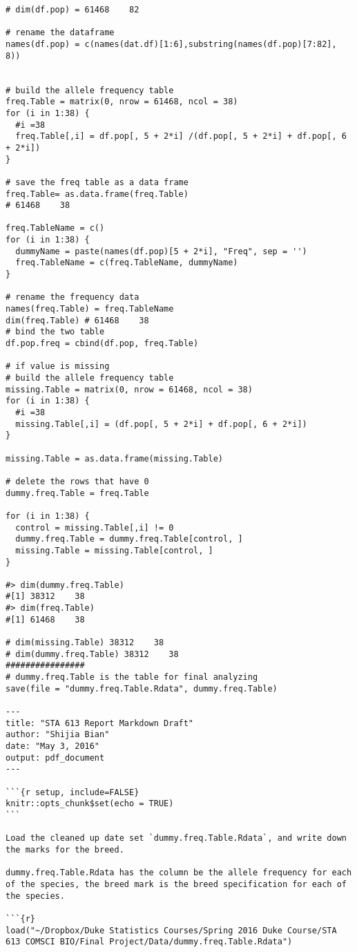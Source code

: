 \documentclass{article} %
\begin{document}
{\begin{verbatim}
# dim(df.pop) = 61468    82

# rename the dataframe
names(df.pop) = c(names(dat.df)[1:6],substring(names(df.pop)[7:82], 8))


# build the allele frequency table
freq.Table = matrix(0, nrow = 61468, ncol = 38)
for (i in 1:38) {
  #i =38
  freq.Table[,i] = df.pop[, 5 + 2*i] /(df.pop[, 5 + 2*i] + df.pop[, 6 + 2*i])
}

# save the freq table as a data frame
freq.Table= as.data.frame(freq.Table)
# 61468    38

freq.TableName = c()
for (i in 1:38) {
  dummyName = paste(names(df.pop)[5 + 2*i], "Freq", sep = '')
  freq.TableName = c(freq.TableName, dummyName)
}
  
# rename the frequency data
names(freq.Table) = freq.TableName
dim(freq.Table) # 61468    38
# bind the two table
df.pop.freq = cbind(df.pop, freq.Table)

# if value is missing
# build the allele frequency table
missing.Table = matrix(0, nrow = 61468, ncol = 38)
for (i in 1:38) {
  #i =38
  missing.Table[,i] = (df.pop[, 5 + 2*i] + df.pop[, 6 + 2*i])
}

missing.Table = as.data.frame(missing.Table)

# delete the rows that have 0
dummy.freq.Table = freq.Table

for (i in 1:38) {
  control = missing.Table[,i] != 0 
  dummy.freq.Table = dummy.freq.Table[control, ]
  missing.Table = missing.Table[control, ]
}

#> dim(dummy.freq.Table)
#[1] 38312    38
#> dim(freq.Table)
#[1] 61468    38

# dim(missing.Table) 38312    38
# dim(dummy.freq.Table) 38312    38
################
# dummy.freq.Table is the table for final analyzing
save(file = "dummy.freq.Table.Rdata", dummy.freq.Table)

---
title: "STA 613 Report Markdown Draft"
author: "Shijia Bian"
date: "May 3, 2016"
output: pdf_document
---

```{r setup, include=FALSE}
knitr::opts_chunk$set(echo = TRUE)
```

Load the cleaned up date set `dummy.freq.Table.Rdata`, and write down the marks for the breed. 

dummy.freq.Table.Rdata has the column be the allele frequency for each of the species, the breed mark is the breed specification for each of the species.

```{r}
load("~/Dropbox/Duke Statistics Courses/Spring 2016 Duke Course/STA 613 COMSCI BIO/Final Project/Data/dummy.freq.Table.Rdata")


\end{verbatim}}
\end{document}
